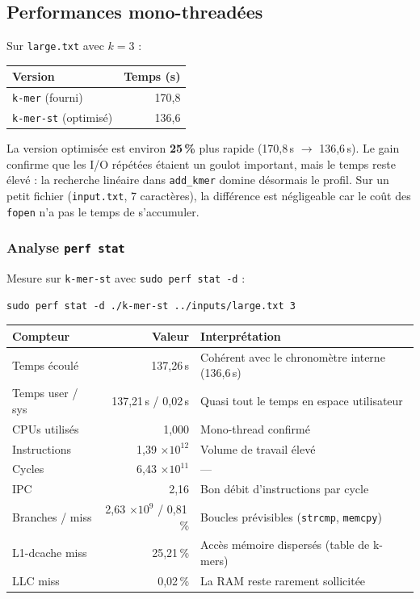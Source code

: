 \documentclass[a4paper,12pt]{article}
\begin{document}
\subsection{Performances mono-threadées}

Sur \texttt{large.txt} avec $k = 3$ :

\begin{center}
\begin{tabular}{|l|r|}
\hline
Version & Temps (s) \\
\hline
\texttt{k-mer} (fourni) & 170{,}8 \\
\texttt{k-mer-st} (optimisé) & 136{,}6 \\
\hline
\end{tabular}
\end{center}

La version optimisée est environ \textbf{25\,\%} plus rapide (170{,}8\,s $\rightarrow$ 136{,}6\,s). Le gain confirme que les I/O répétées étaient un goulot important, mais le temps reste élevé : la recherche linéaire dans \texttt{add\_kmer} domine désormais le profil. Sur un petit fichier (\texttt{input.txt}, 7 caractères), la différence est négligeable car le coût des \texttt{fopen} n'a pas le temps de s'accumuler.

\subsubsection{Analyse \texttt{perf stat}}

Mesure sur \texttt{k-mer-st} avec \texttt{sudo perf stat -d} :

\begin{verbatim}
sudo perf stat -d ./k-mer-st ../inputs/large.txt 3
\end{verbatim}

\begin{center}
\begin{tabular}{|l|r|l|}
\hline
Compteur & Valeur & Interprétation \\
\hline
Temps écoulé & 137{,}26\,s & Cohérent avec le chronomètre interne (136{,}6\,s) \\
Temps user / sys & 137{,}21\,s / 0{,}02\,s & Quasi tout le temps en espace utilisateur \\
CPUs utilisés & 1{,}000 & Mono-thread confirmé \\
Instructions & 1{,}39 $\times 10^{12}$ & Volume de travail élevé \\
Cycles & 6{,}43 $\times 10^{11}$ & --- \\
IPC & 2{,}16 & Bon débit d'instructions par cycle \\
Branches / miss & 2{,}63 $\times 10^{9}$ / 0{,}81\,\% & Boucles prévisibles (\texttt{strcmp}, \texttt{memcpy}) \\
L1-dcache miss & 25{,}21\,\% & Accès mémoire dispersés (table de k-mers) \\
LLC miss & 0{,}02\,\% & La RAM reste rarement sollicitée \\
\hline
\end{tabular}
\end{center}
\end{document}
